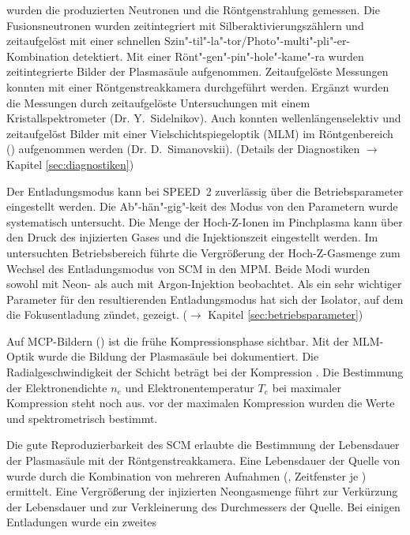 wurden die produzierten Neutronen und die Röntgenstrahlung
gemessen. Die Fusionsneutronen wurden zeitintegriert mit
Silberaktivierungszählern und zeitaufgelöst mit einer schnellen
Szin"-til"-la"-tor/Photo"-multi"-pli"-er-Kombination detektiert.
Mit einer Rönt"-gen"-pin"-hole"-kame"-ra wurden zeitintegrierte
Bilder der Plasmasäule aufgenommen. Zeitaufgelöste Messungen
konnten mit einer Röntgenstreakkamera durchgeführt werden. Ergänzt
wurden die Messungen durch zeitaufgelöste Untersuchungen mit einem
Kristallspektrometer (Dr. Y.~Sidelnikov). Auch konnten
wellenlängenselektiv und zeitaufgelöst Bilder mit einer
Vielschichtspiegeloptik (MLM) im Röntgenbereich () aufgenommen werden (Dr. D.~Simanovskii). (Details der
Diagnostiken $\rightarrow$ Kapitel \vref{sec:diagnostiken})
\par
Der Entladungsmodus kann bei SPEED~2 zuverlässig über die
Betriebsparameter eingestellt werden. Die Ab"-hän"-gig"-keit des
Modus von den Parametern wurde systematisch untersucht. Die Menge
der Hoch-Z-Ionen im Pinchplasma kann über den Druck des
injizierten Gases und die Injektionszeit eingestellt werden. Im
untersuchten Betriebsbereich führte die Vergrößerung der
Hoch-Z-Gasmenge zum Wechsel des Entladungsmodus von SCM in den
MPM. Beide Modi wurden sowohl mit Neon- als auch mit
Argon-Injektion beobachtet. Als ein sehr wichtiger Parameter für
den resultierenden Entladungsmodus hat sich der Isolator, auf dem
die Fokusentladung zündet, gezeigt. ($\rightarrow$ Kapitel
\vref{sec:betriebsparameter})
\par
Auf MCP-Bildern () ist die frühe
Kompressionsphase sichtbar. Mit der MLM-Optik wurde die Bildung der
Plasmasäule bei  dokumentiert. Die
Radialgeschwindigkeit der Schicht beträgt bei der Kompression
. Die Bestimmung der Elektronendichte $n_e$
und Elektronentemperatur $T_e$ bei maximaler Kompression steht noch
aus.  vor der maximalen Kompression wurden die Werte
 und 
spektrometrisch bestimmt.
\par
Die gute Reproduzierbarkeit des SCM erlaubte die Bestimmung der
Lebensdauer der Plasmasäule mit der Röntgenstreakkamera. Eine
Lebensdauer der Quelle von  wurde durch die Kombination
von mehreren Aufnahmen (, Zeitfenster je
) ermittelt. Eine Vergrößerung der injizierten
Neongasmenge führt zur Verkürzung der Lebensdauer und zur Verkleinerung
des Durchmessers der Quelle. Bei einigen Entladungen wurde ein zweites
